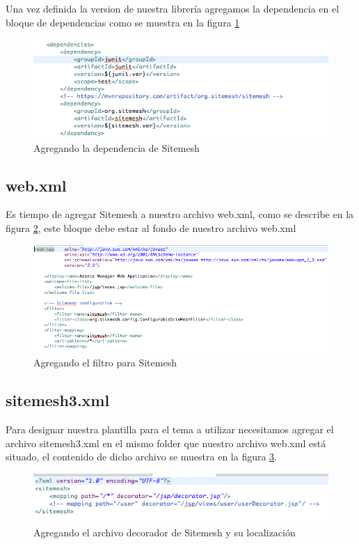 \documentclass[12pt,a4paper]{article}
\begin{document}
        Una vez definida la version de nuestra librer\'ia agregamos la dependencia en el bloque de dependencias como se muestra en la figura \ref{06_pom_xml}
        \begin{figure}[h]
            \centering
            \includegraphics[scale=0.4]{06_pom_xml}
            \caption{Agregando la dependencia de Sitemesh}
            \label{06_pom_xml}
        \end{figure}
        
        \subsection{web.xml}
        Es tiempo de agregar Sitemesh a nuestro archivo web.xml, como se describe en la figura \ref{07_web_xml}, este bloque debe estar al fondo de nuestro archivo web.xml
        \begin{figure}[h]
            \centering
            \includegraphics[scale=0.4]{07_web_xml}
            \caption{Agregando el filtro para Sitemesh}
            \label{07_web_xml}
        \end{figure}
        
        \subsection{sitemesh3.xml}
        Para designar nuestra plantilla para el tema a utilizar necesitamos agregar el archivo sitemesh3.xml en el mismo folder que nuestro archivo web.xml est\'a situado, el contenido de dicho archivo se muestra en la figura \ref{08_sitemesh3_xml}.
        \begin{figure}[h]
            \centering
            \includegraphics[scale=0.4]{08_sitemesh3_xml}
            \caption{Agregando el archivo decorador de Sitemesh y su localizaci\'on}
            \label{08_sitemesh3_xml}
        \end{figure}
         
\end{document}
